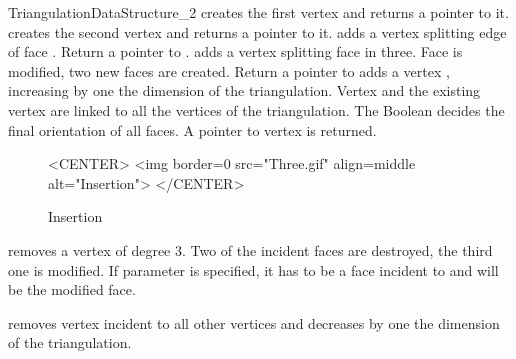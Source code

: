 \begin{ccRefConcept}{TriangulationDataStructure_2}
 {creates the first 
vertex and returns a pointer to it.}
\ccGlue
{} {creates the second 
vertex and returns a pointer to it.}
 {adds a
vertex  splitting 
edge  of face . Return a  pointer to .}
\ccGlue
{} {adds a vertex
 splitting  face
 in three. Face  is modified,
two new faces are created. Return a  pointer to  }
\ccGlue
{} 
{adds
a vertex , increasing by one the dimension of the triangulation.
Vertex  and the existing vertex  are linked to all 
the vertices of the triangulation. 
The Boolean  decides the final orientation of all 
faces. A pointer to vertex  is returned.
}

\begin{figure}
\begin{ccTexOnly}
\begin{center}  \end{center}
\caption{Insertion}
\end{ccTexOnly} 

\begin{ccHtmlOnly}
<CENTER>
<img border=0 src="Three.gif" align=middle alt="Insertion">
</CENTER>
\end{ccHtmlOnly} 
\end{figure}


{removes a vertex of degree 3. Two of the incident faces are destroyed,
the third one is modified.
If parameter   is specified, it has to be a face incident to 
and will be the modified face.
}



\ccGlue
{}
\ccGlue
{}
{removes vertex  incident to all other vertices
and  decreases by one the dimension of the triangulation.
 }



\end{ccRefConcept}
